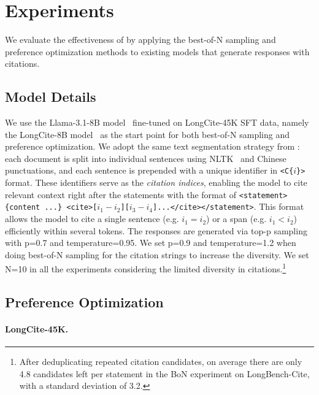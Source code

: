\section{Experiments}

We evaluate the effectiveness of \ours by applying the best-of-N sampling and preference optimization methods to existing models that generate responses with citations.

\subsection{Model Details}
\label{subsec:model}

We use the Llama-3.1-8B model~\citep{dubey2024llama} fine-tuned on LongCite-45K SFT data, namely the LongCite-8B model~\citep{zhang2024longcite} as the start point 
for both best-of-N sampling and preference optimization. We adopt the same text segmentation strategy from \citet{zhang2024longcite}: each document is split into individual sentences using NLTK~\citep{bird2006nltk} and Chinese punctuations, and each sentence is prepended with a unique identifier in \texttt{\small <C\{$i$\}>} format. These identifiers serve as the \emph{citation indices}, enabling the model to cite relevant context right after the statements with the format of \texttt{\small <statement> \{content ...\} <cite>[}$i_1-i_2$\texttt{\small ][}$i_3-i_4$\texttt{\small ]...</cite></statement>}. This format allows the model to cite a single sentence (e.g. $i_1 = i_2$) or a span (e.g. $i_1 < i_2$) efficiently within several tokens. The responses are generated via top-p sampling~\citep{Holtzman2020The} with p=0.7 and temperature=0.95. We set p=0.9 and temperature=1.2 when doing best-of-N sampling for the citation strings to increase the diversity. We set N=10 in all the experiments considering the limited diversity in citations.\footnote{After deduplicating repeated citation candidates, on average there are only 4.8 candidates left per statement in the BoN experiment on LongBench-Cite, with a standard deviation of 3.2.}

\subsection{Preference Optimization}
\label{sec:po}

\paragraph{LongCite-45K.} 

